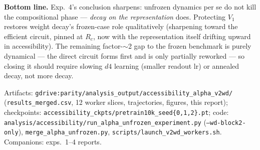 \documentclass[10pt]{article}
\begin{document}
\textbf{Bottom line.} Exp.~4's conclusion sharpens: unfrozen dynamics per se do not kill the
compositional phase --- \emph{decay on the representation} does. Protecting $V_1$ restores
weight decay's frozen-case role qualitatively (sharpening toward the efficient circuit, pinned
at $R_c$, now with the representation itself drifting upward in accessibility). The remaining
factor-$\sim$2 gap to the frozen benchmark is purely dynamical --- the direct circuit forms
first and is only partially reworked --- so closing it should require slowing $d4$ learning
(smaller readout lr) or annealed decay, not more decay.

\vspace{2pt}\footnotesize
Artifacts: \texttt{gdrive:parity/analysis\_output/accessibility\_alpha\_v2wd/}
(\texttt{results\_merged.csv}, 12 worker slices, trajectories, figures, this report);
checkpoints: \texttt{accessibility\_ckpts/pretrain10k\_seed\{0,1,2\}.pt}; code:
\texttt{analysis/accessibility/run\_alpha\_unfrozen\_experiment.py} (\texttt{--wd-block2-only}),
\texttt{merge\_alpha\_unfrozen.py}, \texttt{scripts/launch\_v2wd\_workers.sh}. Companions:
exps.~1--4 reports.
\end{document}
